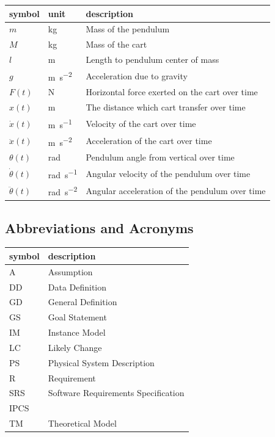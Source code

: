 \documentclass[12pt]{article}
\begin{document}
\renewcommand{\arraystretch}{1.2}
\noindent \begin{longtable*}{l l p{12cm}} \toprule
\textbf{symbol} & \textbf{unit} & \textbf{description}\\
\midrule 
$m$ & \si{\kilogram} & Mass of the pendulum\\
$M$ & \si{\kilogram} & Mass of the cart\\
$l$ & \si{\metre} & Length to pendulum center of mass\\ 
$g$ & \si {\metre\per\square\second} & Acceleration due to gravity\\
$F(t)$ & \si {\newton} & Horizontal force exerted on the cart over time \\
$x(t)$ & \si{\metre} & The distance which cart transfer over time \\
$\dot{x}(t)$ & \si {\metre\per\second} & Velocity of the cart over time\\
$\ddot{x}(t)$ & \si {\metre\per\square\second} & Acceleration of the cart over time\\  
$\theta (t)$ & \si{\radian} & Pendulum angle from vertical over time\\
$\dot{\theta}(t)$ & \si {\radian\per\second} & Angular velocity of the pendulum over time\\
$\ddot{\theta}(t)$ & \si {\radian\per\square\second} & Angular acceleration of the pendulum over time\\
\bottomrule
\end{longtable*}

\subsection{Abbreviations and Acronyms}

\renewcommand{\arraystretch}{1.2}
\begin{tabular}{l l} 
  \toprule		
  \textbf{symbol} & \textbf{description}\\
  \midrule 
  A & Assumption\\
  DD & Data Definition\\
  GD & General Definition\\
  GS & Goal Statement\\
  IM & Instance Model\\
  LC & Likely Change\\
  PS & Physical System Description\\
  R & Requirement\\
  SRS & Software Requirements Specification\\
  IPCS & \progname{}\\
  TM & Theoretical Model\\
  \bottomrule
\end{tabular}\\
\end{document}
